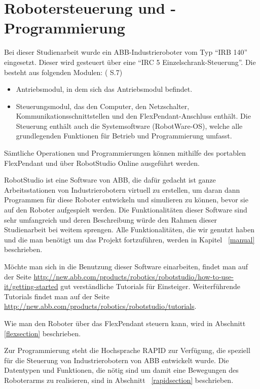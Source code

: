 
\chapter{Robotersteuerung und -Programmierung}
Bei dieser Studienarbeit wurde ein ABB-Industrieroboter vom Typ \enquote{IRB 140} eingesetzt. Dieser wird gesteuert über eine \enquote{IRC 5 Einzelschrank-Steuerung}. Die besteht aus folgenden Modulen: (\cite{irc5} S.7)

\begin{itemize}
\item Antriebsmodul, in dem sich das Antriebsmodul befindet.

\item Steuerungsmodul, das den Computer, den Netzschalter, Kommunikationsschnittstellen und den FlexPendant-Anschluss enthält. Die Steuerung enthält auch die Systemsoftware (RobotWare-OS), welche alle grundlegenden Funktionen für Betrieb und Programmierung umfasst.
\end{itemize}

Sämtliche Operationen und Programmierungen können mithilfe des portablen FlexPendant und über RobotStudio Online ausgeführt werden. 

RobotStudio ist eine Software von ABB, die dafür gedacht ist ganze Arbeitsstationen von Industrierobotern virtuell zu erstellen, um daran dann Programmen für diese Roboter entwickeln und simulieren zu können, bevor sie auf den Roboter aufgespielt werden. Die Funktionalitäten dieser Software sind sehr umfangreich und deren Beschreibung würde den Rahmen dieser Studienarbeit bei weitem sprengen. Alle Funktionalitäten, die wir genutzt haben und die man benötigt um das Projekt fortzuführen, werden in Kapitel ~\ref{manual} beschrieben. 

Möchte man sich in die Benutzung dieser Software einarbeiten, findet man auf der Seite \href{http://new.abb.com/products/robotics/robotstudio/how-to-use-it/getting-started}{http://new.abb.com/products/robotics/robotstudio/how-to-use-it/getting-started} gut verständliche Tutorials für Einsteiger. Weiterführende Tutorials findet man auf der Seite \href{http://new.abb.com/products/robotics/robotstudio/tutorials}{http://new.abb.com/products/robotics/robotstudio/tutorials}.

Wie man den Roboter über das FlexPendant steuern kann, wird in Abschnitt \ref{flexsection} beschrieben.

Zur Programmierung steht die Hochsprache RAPID zur Verfügung, die speziell für die Steuerung von Industrierobotern von ABB entwickelt wurde. Die Datentypen und Funktionen, die nötig sind um damit eine Bewegungen des Roboterarms zu realisieren, sind in Abschnitt ~\ref{rapidsection} beschrieben.

